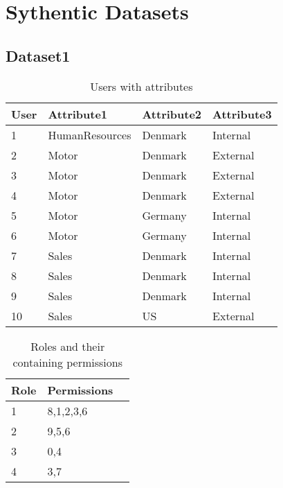 \newpage
\section{Sythentic Datasets}
\label{sec:A_syn_datasets}
	\subsection{Dataset1}
		\begin{table}[H]
			\centering
			\caption{Users with attributes}
			\label{tab:dataset1_users}
			\begin{tabular}{|l|l|l|l|}
				\hline
				\rowcolor[HTML]{EFEFEF} 
				User & Attribute1     & Attribute2 & Attribute3 \\ \hline
				1    & HumanResources & Denmark    & Internal   \\ \hline
				2    & Motor          & Denmark    & External   \\ \hline
				3    & Motor          & Denmark    & External   \\ \hline
				4    & Motor          & Denmark    & External   \\ \hline
				5    & Motor          & Germany    & Internal   \\ \hline
				6    & Motor          & Germany    & Internal   \\ \hline
				7    & Sales          & Denmark    & Internal   \\ \hline
				8    & Sales          & Denmark    & Internal   \\ \hline
				9    & Sales          & Denmark    & Internal   \\ \hline
				10   & Sales          & US         & External   \\ \hline
			\end{tabular}
		\end{table}
		\begin{table}[H]
			\centering
			\caption{Roles and their containing permissions}
			\label{tab:dataset1_roles}
			\begin{tabular}{|l|l|l|}
				\hline
				\rowcolor[HTML]{EFEFEF} 
				Role & Permissions \\ \hline
				1    & 8,1,2,3,6   \\ \hline
				2    & 9,5,6       \\ \hline
				3    & 0,4         \\ \hline
				4    & 3,7         \\ \hline
			\end{tabular}
		\end{table}
		
